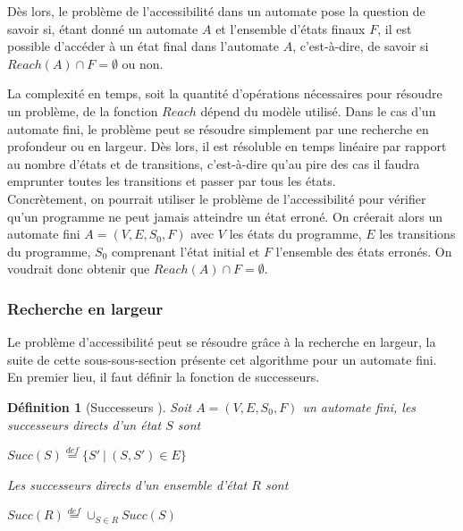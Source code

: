 \documentclass[12pt,a4paper,oneside]{book}
\theoremstyle{break}
\newtheorem{defin}{Définition}[chapter]
\theoremstyle{breakplain}
\begin{document}
Dès lors, le problème de l'accessibilité dans un automate pose la question de savoir si, étant donné un automate $A$ et l'ensemble d'états finaux $F$, il est possible d'accéder à un état final dans l'automate $A$, c'est-à-dire, de savoir si $Reach(A) \cap F = \emptyset$ ou non.

La complexité en temps, soit la quantité d'opérations nécessaires pour résoudre un problème, de la fonction $Reach$ dépend du modèle utilisé. Dans le cas d'un automate fini, le problème peut se résoudre simplement par une recherche en profondeur ou en largeur. Dès lors, il est résoluble en temps linéaire par rapport au nombre d'états et de transitions, c'est-à-dire qu'au pire des cas il faudra emprunter toutes les transitions et passer par tous les états.\\

Concrètement, on pourrait utiliser le problème de l'accessibilité pour vérifier qu'un programme ne peut jamais atteindre un état erroné. On créerait alors un automate fini  $A = (V, E, S_0, F)$ avec $V$ les états du programme, $E$ les transitions du programme, $S_0$ comprenant l'état initial et $F$ l'ensemble des états erronés. On voudrait donc obtenir que $Reach(A) \cap F = \emptyset$.\\

\subsubsection{Recherche en largeur}
Le problème d'accessibilité peut se résoudre grâce à la recherche en largeur, la suite de cette sous-sous-section présente cet algorithme pour un automate fini.\\

En premier lieu, il faut définir la fonction de successeurs.\\

\begin{defin}[Successeurs \cite{geeraerts2013multiprocessor}]
Soit $A = (V, E, S_0, F)$ un automate fini, les successeurs directs d'un état $S$ sont 
\begin{center}
$Succ(S) \overset{def}{=} \{S'\ |\ (S, S') \in E  \}$\\
\end{center}

Les successeurs directs d'un ensemble d'état $R$ sont
\begin{center}
$Succ(R) \overset{def}{=} \cup_{S\in R}Succ(S)$\\
\end{center}
\end{defin}
\end{document}
